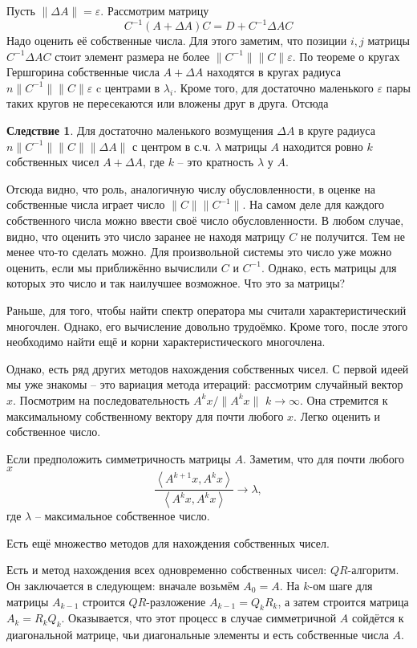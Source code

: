 \documentclass[10pt,a4paper,oneside]{book}
\theoremstyle{definition}
\newtheorem{cor}{\color{green!45!black}Следствие}
\def\eps{\varepsilon}
\def\lan{\left\langle }
\def\ran{\right\rangle}
\def\crl{\begin{cor}}
\def\ecrl{\end{cor}}
\begin{document}
Пусть $\| \Delta A\|=\eps$. Рассмотрим матрицу
$$C^{-1}(A+\Delta A) C= D+C^{-1}\Delta A C $$
Надо оценить её собственные числа. Для этого заметим, что позиции  $i,j$ матрицы $C^{-1}\Delta A C$ стоит элемент размера не более $\| C^{-1}\| \|C\| \eps$. По теореме о кругах Гершгорина собственные числа $A+\Delta A$ находятся в кругах радиуса $n \| C^{-1}\| \|C\| \eps $ c центрами в $\lambda_i$. Кроме того, для достаточно маленького $\eps$ пары таких кругов не пересекаются или вложены друг в друга. Отсюда

\crl Для достаточно маленького возмущения $\Delta A$ в круге радиуса  $n \| C^{-1}\| \|C\| \|\Delta A\|$ с центром в с.ч.  $\lambda$ матрицы $A$ находится ровно $k$ собственных чисел $A+\Delta A$, где $k$ -- это кратность $\lambda$ у $A$.
\ecrl

Отсюда видно, что  роль, аналогичную числу обусловленности, в оценке на собственные числа играет число $\|C\|\|C^{-1}\|$. На самом деле для каждого собственного числа можно ввести своё число обусловленности. В любом случае, видно, что оценить это число заранее не находя матрицу $C$ не получится. Тем не менее что-то сделать можно. Для произвольной системы это число уже можно оценить, если мы приближённо вычислили $C$ и $C^{-1}$. Однако, есть матрицы для которых это число и так наилучшее возможное. Что это за матрицы?


Раньше, для того, чтобы найти спектр оператора мы считали характеристический многочлен. Однако, его вычисление довольно трудоёмко. Кроме того, после этого необходимо найти ещё и корни характеристического многочлена.


Однако, есть ряд других методов нахождения собственных чисел. С первой идеей мы уже знакомы -- это вариация метода итераций: рассмотрим случайный вектор $x$. Посмотрим на последовательность $A^kx/\|A^kx\|$ $k\to \infty$. Она стремится к максимальному собственному вектору для почти любого $x$. Легко оценить и собственное число.

Если предположить симметричность матрицы $A$. Заметим, что  для почти любого $x$ 
$$\frac {\lan A^{k+1}x, A^k x \ran}{\lan A^k x, A^k x \ran} \to \lambda, $$
где $\lambda$ -- максимальное собственное число.

Есть ещё множество методов для нахождения собственных чисел. 

Есть и метод нахождения всех одновременно собственных чисел: $QR$-алгоритм. Он заключается в следующем: вначале возьмём $A_0=A$. На $k$-ом шаге для матрицы $A_{k-1}$ строится $QR$-разложение $A_{k-1}=Q_kR_k$, а затем строится матрица $A_k=R_kQ_k$. Оказывается, что этот процесс в случае симметричной $A$ сойдётся к диагональной матрице, чьи диагональные элементы  и есть собственные числа $A$. 
\end{document}
